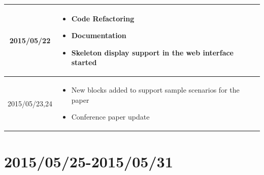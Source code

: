 \documentclass[11pt]{article} %
\begin{document}
\begin{center}
\begin{longtable}{ | c | p{6cm} | p{5cm} |}
  2015/05/22         & 
  \begin{itemize}
  \item Code Refactoring
  \item Documentation
  \item Skeleton display support in the web interface started
\end{itemize}   
  & 
\\
  										 \hline
  										 
  2015/05/23,24         & 
  \begin{itemize}
  \item New blocks added to support sample scenarios for the paper
  \item Conference paper update
\end{itemize}   
  & 
\\
  										 \hline										 
  										   								 
    \end{longtable}
\end{center}

\newpage
\section{2015/05/25-2015/05/31}
\end{document}
